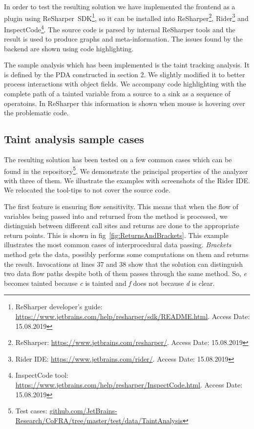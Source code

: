 In order to test the resulting solution we have implemented the frontend as a plugin using ReSharper~SDK\footnote{ReSharper developer's guide: \url{https://www.jetbrains.com/help/resharper/sdk/README.html}. Access Date: 15.08.2019}, so it can be installed into ReSharper\footnote{ReSharper: \url{https://www.jetbrains.com/resharper/}. Access Date: 15.08.2019}, Rider\footnote{Rider IDE: \url{https://www.jetbrains.com/rider/}. Access Date: 15.08.2019} and InspectCode\footnote{InspectCode tool: \url{https://www.jetbrains.com/help/resharper/InspectCode.html}. Access Date: 15.08.2019}.
The source code is parsed by internal ReSharper tools and the result is used to produce graphs and meta-information.
The issues found by the backend are shown using code highlighting.

The sample analysis which has been implemented is the taint tracking analysis.
It is defined by the PDA constructed in section 2.
We slightly modified it to better process interactions with object fields.
We accompany code highlighting with the complete path of a tainted variable from a source to a sink as a sequence of operatoins.
In ReSharper this information is shown when mouse is hovering over the problematic code.

\subsection{Taint analysis sample cases}

The resulting solution has been tested on a few common cases which can be found in the repository\footnote{Test cases: \url{github.com/JetBrains-Research/CoFRA/tree/master/test/data/TaintAnalysis}}.
We demonstrate the principal properties of the analyzer with three of them.
We illustrate the examples with screenshots of the Rider IDE.
We relocated the tool-tips to not cover the source code.

The first feature is ensuring flow sensitivity.
This means that when the flow of variables being passed into and returned from the method is processed, we distinguish between different call sites and returns are done to the appropriate return points.
This is shown in fig~\ref{fig:ReturnsAndBrackets}.
This example illustrates the most common cases of interprocedural data passing.
\textit{Brackets} method gets the data, possibly performs some computations on them and returns the result.
Invocations at lines 37 and 38 show that the solution can distinguish two data flow paths despite both of them passes through the same method.
So, \textit{e} becomes tainted because \textit{c} is tainted and \textit{f} does not because \textit{d} is clear.

